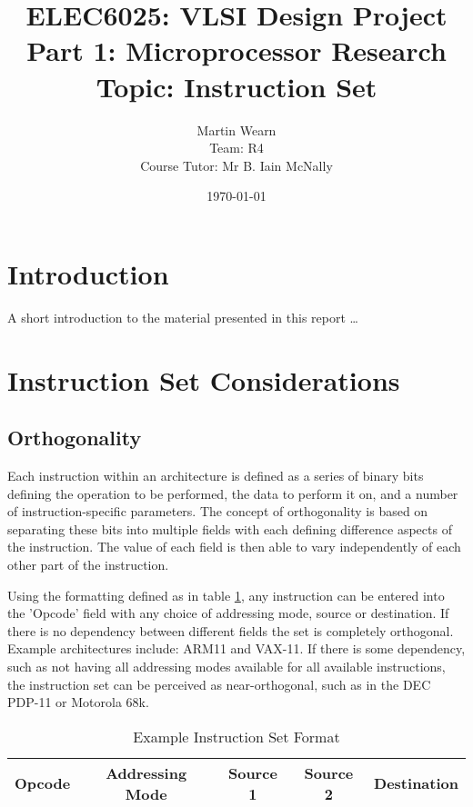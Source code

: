 \documentclass[12pt,a4paper]{article}
\title{ELEC6025: VLSI Design Project \\Part 1: Microprocessor Research\\Topic: Instruction Set}
\author{Martin Wearn\\ Team: R4\\Course Tutor: Mr B. Iain McNally}
\date{\today}
\begin{document}
\begin{titlepage}
\maketitle
\end{titlepage}

\tableofcontents
\clearpage

\section{Introduction}
A short introduction to the material presented in this report \dots\citep{greenwade93}

\section{Instruction Set Considerations}

\subsection{Orthogonality}
Each instruction within an architecture is defined as a series of binary bits defining the operation to be performed, the data to perform it on, and a number of instruction-specific parameters. 
The concept of orthogonality is based on separating these bits into multiple fields with each defining difference aspects of the instruction. 
The value of each field is then able to vary independently of each other part of the instruction. \cite{wiki:OrthogonalIS}

Using the formatting defined as in table \ref{tab:ExFormat}, any instruction can be entered into the 'Opcode' field with any choice of addressing mode, source or destination. If there is no dependency between different fields the set is completely orthogonal. Example architectures include: ARM11 and VAX-11. \cite{wiki:OrthogonalIS}
If there is some dependency, such as not having all addressing modes available for all available instructions, the instruction set can be perceived as near-orthogonal, such as in the DEC PDP-11 or Motorola 68k. \cite{wiki:OrthogonalIS}



\begin{table}
\centering
\begin{tabular}{|c|c|c|c|c|}
\hline Opcode & Addressing Mode & Source 1 & Source 2 & Destination \\ \hline
\end{tabular}
\caption{\label{tab:ExFormat}Example Instruction Set Format}
\end{table}
\end{document}
